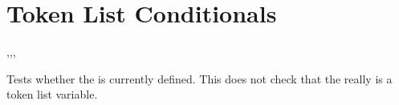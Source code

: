 \documentclass[oneside]{book}
\begin{document}
%

\section{Token List Conditionals}

\begin{function}{\tlIfExist,\tlIfExistT,\tlIfExistF,\tlIfExistTF}
\begin{syntax}
 
  
  
   
\end{syntax}
Tests whether the  is currently defined.  This does not
check that the  really is a token list variable.
\begin{demohigh}
\tlIfExistTF {} {}
\tlIfExistTF {} {}
\end{demohigh}
\end{function}
\end{document}
